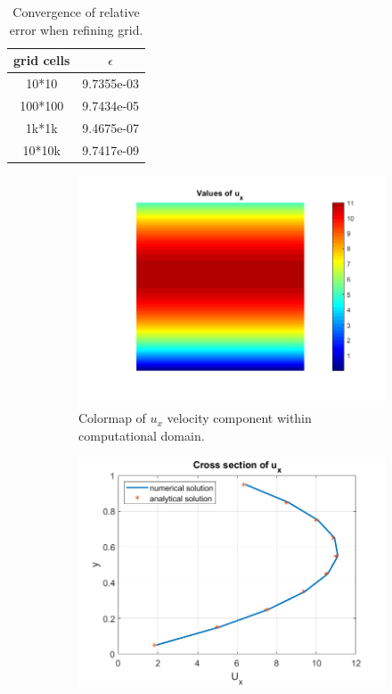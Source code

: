 \documentclass[]{article}
\begin{document}
\begin{table}
	\centering
	\begin{tabular}{|c|c|}
		\hline
		grid cells & $ \epsilon $ \\
		\hline
		10*10 & 9.7355e-03  \\
		\hline
		100*100 & 9.7434e-05  \\
		\hline
		1k*1k & 9.4675e-07 \\
		\hline
		10*10k & 9.7417e-09 \\
		\hline
	\end{tabular}
	\caption{Convergence of relative error when refining grid.}
	\label{tab:pressure_momentum_grid}
\end{table}

\begin{figure}
	\centering
	\begin{subfigure}{.49\textwidth}
		\centering
		\includegraphics[width=1\linewidth]{figs/pressure_lid_flow}
		\caption{Colormap of $u_x$ velocity component within computational domain.}
		\label{fig:pressurelidflow}
	\end{subfigure}
	\begin{subfigure}{.49\textwidth}
		\centering
		\includegraphics[width=1\linewidth]{figs/pressure_driven_flow_cross10}

\end{subfigure}
\end{figure}
\end{document}
